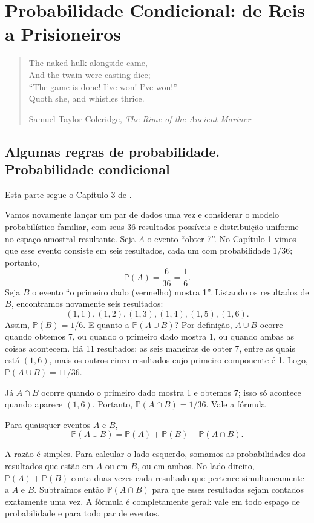 \section{Probabilidade Condicional: de Reis a Prisioneiros}

\begin{quote}
The naked hulk alongside came,\\
And the twain were casting dice;\\
``The game is done! I've won! I've won!''\\
Quoth she, and whistles thrice.

\hfill Samuel Taylor Coleridge, \emph{The Rime of the Ancient Mariner}
\end{quote}

\subsection{Algumas regras de probabilidade. Probabilidade condicional}
\label{isaac:sec:prob-cond}

Esta parte segue o Capítulo 3 de \cite{Isaac1995}.

Vamos novamente lançar um par de dados uma vez e considerar o modelo probabilístico familiar, com seus 36 resultados possíveis e distribuição uniforme no espaço amostral resultante. Seja $A$ o evento ``obter 7''. No Capítulo 1 vimos que esse evento consiste em seis resultados, cada um com probabilidade $1/36$; portanto,
\[
\mathbb{P}(A)=\frac{6}{36}=\frac16.
\]
Seja $B$ o evento ``o primeiro dado (vermelho) mostra 1''. Listando os resultados de $B$, encontramos novamente seis resultados:
\[
(1,1),(1,2),(1,3),(1,4),(1,5),(1,6).
\]
Assim, $\mathbb{P}(B)=1/6$. E quanto a $\mathbb{P}(A\cup B)$? Por definição, $A\cup B$ ocorre quando obtemos 7, ou quando o primeiro dado mostra 1, ou quando ambas as coisas acontecem. Há 11 resultados: as seis maneiras de obter 7, entre as quais está $(1,6)$, mais os outros cinco resultados cujo primeiro componente é 1. Logo, $\mathbb{P}(A\cup B)=11/36$.

Já $A\cap B$ ocorre quando o primeiro dado mostra 1 e obtemos 7; isso só acontece quando aparece $(1,6)$. Portanto, $\mathbb{P}(A\cap B)=1/36$. Vale a fórmula
\begin{theorem}
\label{isaac:thm:adicao}
Para quaisquer eventos $A$ e $B$,
\[
\mathbb{P}(A\cup B)=\mathbb{P}(A)+\mathbb{P}(B)-\mathbb{P}(A\cap B).
\]
\end{theorem}

A razão é simples. Para calcular o lado esquerdo, somamos as probabilidades dos resultados que estão em $A$ ou em $B$, ou em ambos. No lado direito, $\mathbb{P}(A)+\mathbb{P}(B)$ conta duas vezes cada resultado que pertence simultaneamente a $A$ e $B$. Subtraímos então $\mathbb{P}(A\cap B)$ para que esses resultados sejam contados exatamente uma vez. A fórmula é completamente geral: vale em todo espaço de probabilidade e para todo par de eventos.

